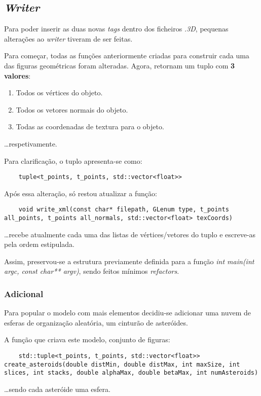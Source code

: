 \documentclass[relatorio.tex]{subfiles}
\begin{document}

\subsection{\textit{Writer}} \label{subsec:writer}

Para poder inserir as duas novas \textit{tags}
dentro dos ficheiros \textit{.3D}, pequenas 
alterações ao \textit{writer} tiveram de ser feitas.

Para começar, todas as funções anteriormente 
criadas para construir cada uma das figuras 
geométricas foram alteradas.
Agora, retornam um tuplo com \textbf{3 valores}:
\begin{enumerate}
    \item Todos os vértices do objeto.
    \item Todos os vetores normais do objeto.
    \item Todas as coordenadas de textura para o objeto.
\end{enumerate}
\dots respetivamente.

Para clarificação, o tuplo apresenta-se como:
\begin{verbatim}
    tuple<t_points, t_points, std::vector<float>> 
\end{verbatim}

Após essa alteração, só restou atualizar a função:
\begin{verbatim}
    void write_xml(const char* filepath, GLenum type, t_points all_points, t_points all_normals, std::vector<float> texCoords)
\end{verbatim}
\dots recebe atualmente cada uma das listas de vértices/vetores 
do tuplo e escreve-as pela ordem estipulada.

Assim, preservou-se a estrutura previamente definida 
para a função \textit{int main(int argc, const char** argv)},
sendo feitos mínimos \textit{refactors}.

\subsubsection{Adicional} \label{subsec:aster}

Para popular o modelo com mais elementos decidiu-se 
adicionar uma nuvem de esferas de organização aleatória,
um cinturão de asteróides. 

A função que criava este modelo, conjunto de figuras:
\begin{verbatim}
    std::tuple<t_points, t_points, std::vector<float>> create_asteroids(double distMin, double distMax, int maxSize, int slices, int stacks, double alphaMax, double betaMax, int numAsteroids)
\end{verbatim}
\dots sendo cada asteróide uma esfera.
\end{document}
